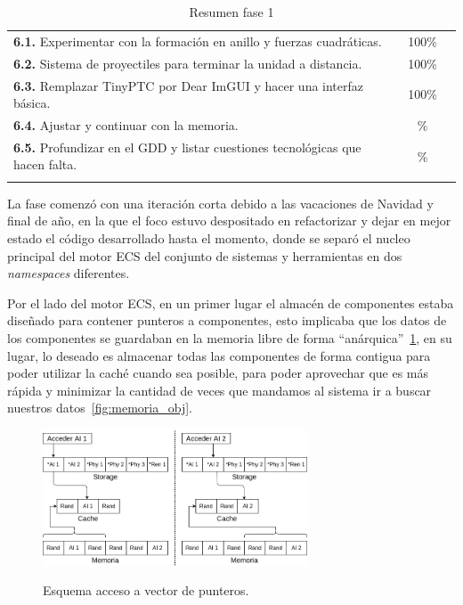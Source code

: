 \begin{longtable}[c]{|p{7cm}|c|c|}
	\cmidrule[1pt]{1-3}

\textbf{6.1.} Experimentar con la formación en anillo
				y fuerzas cuadráticas.                     & 100\% &   \\
	\cmidrule[.003pt]{1-3}
\textbf{6.2.} Sistema de proyectiles para terminar la
				unidad a distancia.                        & 100\% &   \\
	\cmidrule[.003pt]{1-3}
\textbf{6.3.} Remplazar  TinyPTC por Dear ImGUI y
				hacer una interfaz básica.                 & 100\% &   \\
	\cmidrule[.003pt]{1-3}
\textbf{6.4.} Ajustar y continuar con la memoria.          & \% &   \\
	\cmidrule[.003pt]{1-3}
\textbf{6.5.} Profundizar en el GDD y listar cuestiones
				tecnológicas que hacen falta.              & \% &   \\
\hline
\caption{Resumen fase 1}
\end{longtable}

La fase comenzó con una iteración corta debido a las vacaciones de Navidad y final de año, en la
que el foco estuvo despositado en refactorizar y dejar en mejor estado el código desarrollado
hasta el momento, donde se separó el nucleo principal del motor \ac{ECS} del conjunto de sistemas y
herramientas en dos \textit{namespaces} diferentes. 

Por el lado del motor \ac{ECS}, en un primer lugar el almacén de componentes estaba diseñado
para contener punteros a componentes, esto implicaba que los datos de los componentes se
guardaban en la memoria libre de forma ``anárquica''~\ref{fig:memoria_ptr}, 
en su lugar, lo deseado es almacenar todas las componentes de forma contigua para poder utilizar
la caché cuando sea posible, para poder aprovechar que es más rápida y minimizar la cantidad de
veces que mandamos al sistema ir a buscar nuestros datos~\ref{fig:memoria_obj}.

\begin{figure}[htb]
\centering
\includegraphics[width=0.7\textwidth]{imagenes/diario_desarrollo/memoria2.png}\\
\caption{Esquema acceso a vector de punteros.}
\label{fig:memoria_ptr}
\end{figure}

